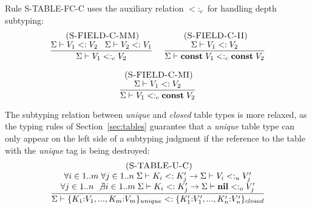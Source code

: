 \documentclass{sigplanconf}
\newcommand{\Nil}{\mathbf{nil}}
\newcommand{\Const}{\mathbf{const}}
\newcommand{\mylabel}[1]{\; (\textsc{#1})}
\newcommand{\senv}{\Sigma}
\newcommand{\subtype}{<:}
\begin{document}
Rule \textsc{S-TABLE-FC-C} uses the auxiliary relation $\subtype_{c}$ for handling depth subtyping:
\[
\begin{array}{c}
\begin{array}{c}
\mylabel{S-FIELD-C-MM}\\
\dfrac{\senv \vdash V_{1} \subtype V_{2} \;\;\;
       \senv \vdash V_{2} \subtype V_{1}}
      {\senv \vdash V_{1} \subtype_{c} V_{2}}
\end{array}
\;
\begin{array}{c}
\mylabel{S-FIELD-C-II}\\
\dfrac{\senv \vdash V_{1} \subtype V_{2}}
      {\senv \vdash \Const \; V_{1} \subtype_{c} \Const \; V_{2}}
\end{array}
\\ \\
\begin{array}{c}
\mylabel{S-FIELD-C-MI}\\
\dfrac{\senv \vdash V_{1} \subtype V_{2}}
      {\senv \vdash V_{1} \subtype_{c} \Const \; V_{2}}
\end{array}
\end{array}
\]

The subtyping relation between {\em unique} and {\em closed}
table types is more relaxed, as the typing rules of Section~\ref{sec:tables} guarantee that a {\em unique}
table type can only appear on the left side of a subtyping
judgment if the reference to the table with the {\em unique}
tag is being destroyed:
\[
\begin{array}{c}
\mylabel{S-TABLE-U-C}\\
\dfrac{\begin{array}{c}
       \forall i \in 1..m \; \forall j \in 1..n \;
       \senv \vdash K_{i} \subtype K_{j}' \to \senv \vdash V_{i} \subtype_{u} V_{j}' \\
       \forall j \in 1..n \; \not\exists i \in 1..m \;
       \senv \vdash K_{i} \subtype K_{j}' \to \senv \vdash \Nil \subtype_{o} V_{j}'
       \end{array}}
      {\senv \vdash \{K_{1}{:}V_{1}, ..., K_{m}{:}V_{m}\}_{unique} \subtype
                    \{K_{1}'{:}V_{1}', ..., K_{n}'{:}V_{n}'\}_{closed}}
\end{array}
\]
\end{document}
